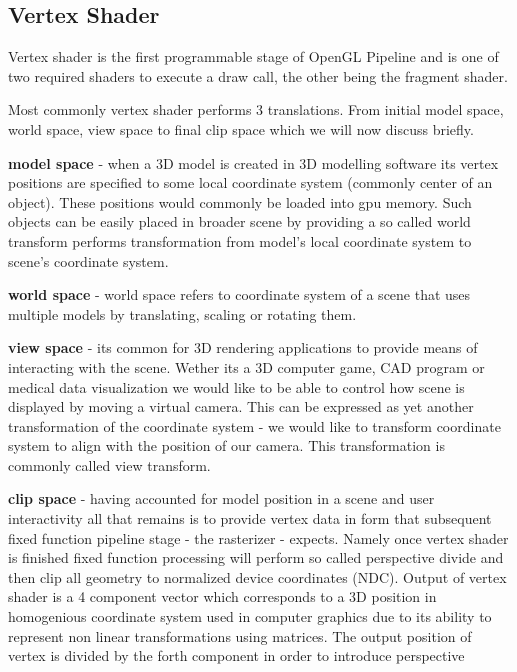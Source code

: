 \subsection{Vertex Shader}

Vertex shader is the first programmable stage of OpenGL Pipeline and is one of two required shaders to execute a draw call, the other being the fragment shader.

Most commonly vertex shader performs 3 translations. From initial model space, world space, view space to final clip space which we will now discuss briefly.

\textbf{model space} - when a 3D model is created in 3D modelling software its vertex positions are specified to some local coordinate system (commonly center of an object).
These positions would commonly be loaded into gpu memory. Such objects can be easily placed in broader scene by providing a so called world transform performs transformation from model's local coordinate system
to scene's coordinate system.

\textbf{world space} - world space refers to coordinate system of a scene that uses multiple models by translating, scaling or rotating them.

\textbf{view space} - its common for 3D rendering applications to provide means of interacting with the scene. Wether its a 3D computer game, CAD program or medical data visualization we would like to be able to 
control how scene is displayed by moving a virtual camera. This can be expressed as yet another transformation of the coordinate system - we would like to transform coordinate system to align with the position of our camera.
This transformation is commonly called view transform.

\textbf{clip space} - having accounted for model position in a scene and user interactivity all that remains is to provide vertex data in form that subsequent fixed function pipeline stage - the rasterizer - expects.
Namely once vertex shader is finished fixed function processing will perform so called perspective divide and then clip all geometry to normalized device coordinates (NDC).
Output of vertex shader is a 4 component vector which corresponds to a 3D position in homogenious coordinate system used in computer graphics due to its ability to represent non linear transformations using matrices.
The output position of vertex is divided by the forth component in order to introduce perspective 


